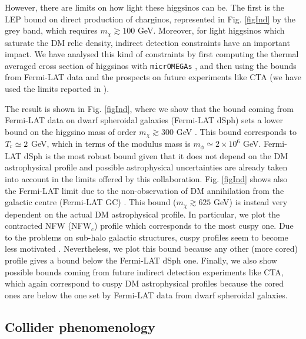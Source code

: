 \documentclass[11pt,a4paper]{article}
\begin{document}
However, there are limits on how light these higgsinos can be. The first is the LEP bound on direct production of charginos, represented in Fig. \ref{figInd} by the grey band, which requires $m_\chi \gtrsim 100$ GeV. Moreover, for light higgsinos which saturate the DM relic density, indirect detection constraints have an important impact. We have analysed this kind of constraints by first computing the thermal averaged cross section of higgsinos with \texttt{micrOMEGAs} \cite{Belanger:2013oya}, and then using the bounds from Fermi-LAT data and the prospects on future experiments like CTA (we have used the limits reported in \cite{Carr:2015hta,Lefranc:2015pza,Silverwood:2014yza}). 

The result is shown in Fig. \ref{figInd}, where we show that the bound coming from Fermi-LAT data on dwarf spheroidal galaxies (Fermi-LAT dSph) sets a lower bound on the higgsino mass of order $m_\chi \gtrsim 300$ GeV \cite{Ackermann:2015zua}. This bound corresponds to $T_{\rm r} \simeq 2$ GeV, which in terms of the modulus mass is $m_\phi \simeq 2\times 10^6$ GeV. Fermi-LAT dSph is the most robust bound given that it does not depend on the DM astrophysical profile and possible astrophysical uncertainties are already taken into account in the limits offered by this collaboration. Fig. \ref{figInd} shows also the Fermi-LAT limit due to the non-observation of DM annihilation from the galactic centre (Fermi-LAT GC) \cite{Gomez-Vargas:2013bea}. This bound ($m_\chi \gtrsim 625$ GeV) is instead very dependent on the actual DM astrophysical profile. In particular, we plot the contracted NFW (NFW$_c$) profile which corresponds to the most cuspy one. Due to the problems on sub-halo galactic structures, cuspy profiles seem to become less motivated \cite{Oh:2015xoa}. Nevertheless, we plot this bound because any other (more cored) profile gives a bound below the Fermi-LAT dSph one. Finally, we also show possible bounds coming from future indirect detection experiments like CTA, which again correspond to cuspy DM astrophysical profiles because the cored ones are below the one set by Fermi-LAT data from dwarf spheroidal galaxies.

\subsection{Collider phenomenology}
\label{CollPheno}
\end{document}
